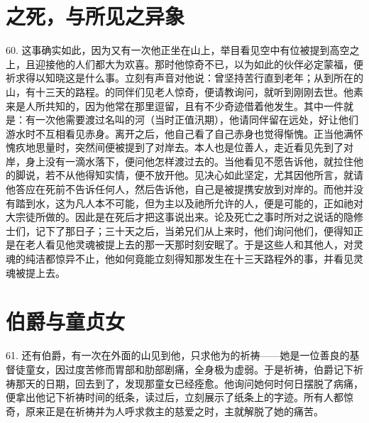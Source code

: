 
\section{之死，与所见之异象}

60. 这事确实如此，因为又有一次他正坐在山上，举目看见空中有位被提到高空之上，且迎接他的人们都大为欢喜。那时他惊奇不已，以为如此的伙伴必定蒙福，便祈求得以知晓这是什么事。立刻有声音对他说：曾坚持苦行直到老年；从到所在的山，有十三天的路程。的同伴们见老人惊奇，便请教询问，就听到刚刚去世。他素来是人所共知的，因为他常在那里逗留，且有不少奇迹借着他发生。其中一件就是：有一次他需要渡过名叫的河（当时正值汛期），他请同伴留在远处，好让他们游水时不互相看见赤身。离开之后，他自己看了自己赤身也觉得惭愧。正当他满怀愧疚地思量时，突然间便被提到了对岸去。本人也是位善人，走近看见先到了对岸，身上没有一滴水落下，便问他怎样渡过去的。当他看见不愿告诉他，就拉住他的脚说，若不从他得知实情，便不放开他。见决心如此坚定，尤其因他所言，就请他答应在死前不告诉任何人，然后告诉他，自己是被提携安放到对岸的。而他并没有踏到水，这为凡人本不可能，但为主以及祂所允许的人，便是可能的，正如祂对大宗徒所做的。因此是在死后才把这事说出来。论及死亡之事时所对之说话的隐修士们，记下了那日子；三十天之后，当弟兄们从上来时，他们询问他们，便得知正是在老人看见他灵魂被提上去的那一天那时刻安眠了。于是这些人和其他人，对灵魂的纯洁都惊异不止，他如何竟能立刻得知那发生在十三天路程外的事，并看见灵魂被提上去。\par


\section{伯爵与童贞女}

61. 还有伯爵，有一次在外面的山见到他，只求他为的祈祷——她是一位善良的基督徒童女，因过度苦修而胃部和肋部剧痛，全身极为虚弱。于是祈祷，伯爵记下祈祷那天的日期，回去到了，发现那童女已经痊愈。他询问她何时何日摆脱了病痛，便拿出他记下祈祷时间的纸条，读过后，立刻展示了纸条上的字迹。所有人都惊奇，原来正是在祈祷并为人呼求救主的慈爱之时，主就解脱了她的痛苦。\par

